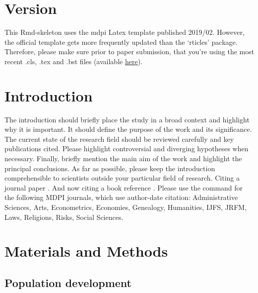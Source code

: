 \documentclass[Agronomy,article,submit,moreauthors,pdftex]{mdpi}
\begin{document}

\hypertarget{version}{%
\section{Version}\label{version}}

This Rmd-skeleton uses the mdpi Latex template published 2019/02.
However, the official template gets more frequently updated than the
`rticles' package. Therefore, please make sure prior to paper
submission, that you're using the most recent .cls, .tex and .bst files
(available \href{http://www.mdpi.com/authors/latex}{here}).

\hypertarget{introduction}{%
\section{Introduction}\label{introduction}}

The introduction should briefly place the study in a broad context and
highlight why it is important. It should define the purpose of the work
and its significance. The current state of the research field should be
reviewed carefully and key publications cited. Please highlight
controversial and diverging hypotheses when necessary. Finally, briefly
mention the main aim of the work and highlight the principal
conclusions. As far as possible, please keep the introduction
comprehensible to scientists outside your particular field of research.
Citing a journal paper
\citep{bertrand-krajewski_distribution_1998, leutnant_stormwater_2016}.
And now citing a book reference \citet{gujer_systems_2008}. Please use
the command \citep{leutnant_stormwater_2016} for the following MDPI
journals, which use author-date citation: Administrative Sciences, Arts,
Econometrics, Economies, Genealogy, Humanities, IJFS, JRFM, Laws,
Religions, Risks, Social Sciences.

\hypertarget{materials-and-methods}{%
\section{Materials and Methods}\label{materials-and-methods}}

\hypertarget{population-development}{%
\subsection{Population development}\label{population-development}}
\end{document}
